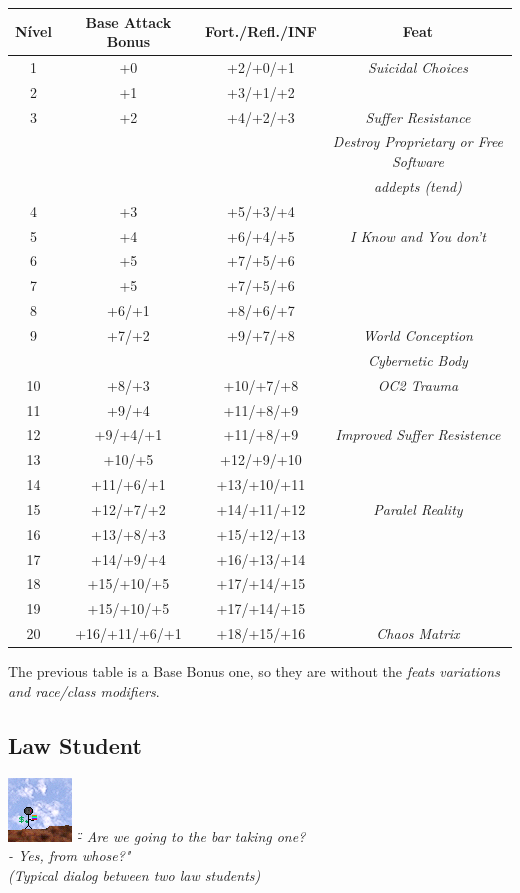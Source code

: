 \documentclass[ letterpaper,12pt]{article}
\begin{document}
\begin{center} \begin{tabular}{|c||c|c|c|}
\hline
{\bf Nível}&{\bf Base Attack Bonus}&{\bf Fort./Refl./INF}&{\bf Feat}\\
\hline
1&+0&+2/+0/+1&{\it Suicidal Choices}\\
\hline
2&+1&+3/+1/+2&\\
\hline
3&+2&+4/+2/+3&{\it Suffer Resistance}\\
&&&{\it Destroy Proprietary or Free Software}\\
&&&{\it addepts (tend)}\\
\hline
4&+3&+5/+3/+4&\\
\hline
5&+4&+6/+4/+5&{\it I Know and You don't}\\
\hline
6&+5&+7/+5/+6&\\
\hline
7&+5&+7/+5/+6&{}\\
\hline
8&+6/+1&+8/+6/+7&\\
\hline
9&+7/+2&+9/+7/+8&{\it World Conception}\\
&&&{\it Cybernetic Body}\\
\hline
10&+8/+3&+10/+7/+8&{\it OC2 Trauma}\\
\hline
11&+9/+4&+11/+8/+9&\\
\hline
12&+9/+4/+1&+11/+8/+9&{\it Improved Suffer Resistence}\\
\hline
13&+10/+5&+12/+9/+10&\\
\hline
14&+11/+6/+1&+13/+10/+11&\\
\hline
15&+12/+7/+2&+14/+11/+12&{\it Paralel Reality}\\
\hline
16&+13/+8/+3&+15/+12/+13&\\
\hline
17&+14/+9/+4&+16/+13/+14&\\
\hline
18&+15/+10/+5&+17/+14/+15&\\
\hline
19&+15/+10/+5&+17/+14/+15&\\
\hline
20&+16/+11/+6/+1&+18/+15/+16&{\it Chaos Matrix}\\
\hline
\end{tabular} \end{center}

The previous table is a Base Bonus one, so they are without the {\it feats variations and race/class modifiers}.\\

\subsection{Law Student}
\includegraphics{../data/classes/Img/direito.png}
{\it \" - Are we going to the bar taking one?\\
        - Yes, from whose?"\\(Typical dialog between two law students)}\\
\end{document}
